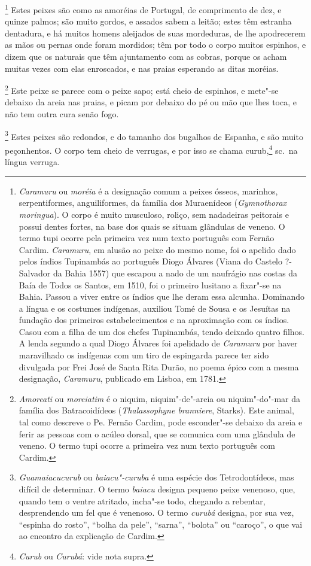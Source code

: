 \footnote{ \textit{Caramuru} ou \textit{moréia} é a
designação comum a peixes ósseos, marinhos, serpentiformes,
anguiliformes, da família dos Muraenídeos (\textit{Gymnothorax
moringua}). O corpo é muito musculoso, roliço, sem nadadeiras peitorais
e possui dentes fortes, na base dos quais se situam glândulas de
veneno. O termo tupi ocorre pela primeira vez num texto português com
Fernão Cardim. \textit{Caramuru}, em alusão ao peixe do mesmo nome, foi
o apelido dado pelos índios Tupinambás ao português Diogo Álvares (Viana
do Castelo ?- Salvador da Bahia 1557) que escapou a nado de um
naufrágio nas costas da Baía de Todos os Santos, em 1510, foi o
primeiro lusitano a fixar"-se na Bahia. Passou a viver entre os índios
que lhe deram essa alcunha. Dominando a língua e os costumes indígenas,
auxiliou Tomé de Sousa e os Jesuítas na fundação dos primeiros
estabelecimentos e na aproximação com os índios. Casou com a filha de
um dos chefes Tupinambás, tendo deixado quatro filhos. A lenda segundo a
qual Diogo Álvares foi apelidado de \textit{Caramuru} por haver
maravilhado os indígenas com um tiro de espingarda parece ter sido
divulgada por Frei José de Santa Rita Durão, no poema épico com a mesma
designação, \textit{Caramuru}, publicado em Lisboa, em 1781.} 
Estes peixes são como as amoréias de Portugal, de comprimento de dez,
e quinze palmos; são muito gordos, e assados sabem a leitão; estes têm
estranha dentadura, e há muitos homens aleijados de suas mordeduras, de
lhe apodrecerem as mãos ou pernas onde foram mordidos; têm por todo o
corpo muitos espinhos, e dizem que os naturais que têm ajuntamento com
as cobras, porque os acham muitas vezes com elas enroscados, e nas
praias esperando as ditas moréias.

\footnote{ \textit{Amoreati} ou \textit{moreiatim} 
é o niquim, niquim"-de"-areia ou niquim"-do"-mar da família dos
Batracoidídeos (\textit{Thalassophyne branniere}, Starks). Este animal,
tal como descreve o Pe. Fernão Cardim, pode esconder"-se debaixo da
areia e ferir as pessoas com o acúleo dorsal, que se comunica com uma
glândula de veneno. O termo tupi ocorre a primeira vez num texto
português com Cardim.} Este peixe se parece com o peixe
sapo; está cheio de espinhos, e mete"-se debaixo da areia nas praias, e
picam por debaixo do pé ou mão que lhes toca, e não tem outra cura
senão fogo.

\footnote{ \textit{Guamaiacucurub} ou
\textit{baiacu"-curuba} é uma espécie dos Tetrodontídeos, mas difícil
de determinar. O termo \textit{baiacu} designa pequeno peixe venenoso,
que, quando tem o ventre atritado, incha"-se todo, chegando a rebentar,
desprendendo um fel que é venenoso. O termo \textit{curubá} designa,
por sua vez, ``espinha do rosto'', ``bolha da pele'', ``sarna'', ``bolota'' ou
``caroço'', o que vai ao encontro da explicação de Cardim.} 
Estes peixes são redondos, e do tamanho dos bugalhos de Espanha, e são
muito peçonhentos. O corpo tem cheio de verrugas, e por isso se chama
curub,\footnote{ \textit{Curub} ou \textit{Curubá}: vide nota supra.} 
sc.~na língua verruga.

